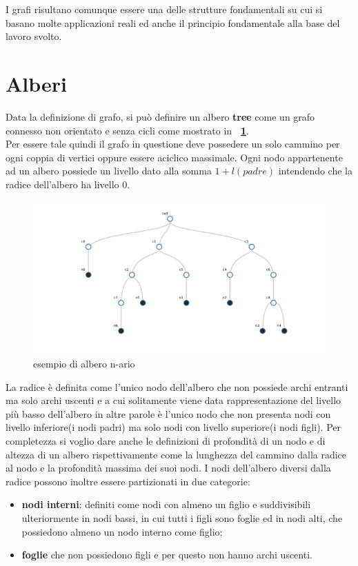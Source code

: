 {I grafi risultano comunque essere una delle strutture fondamentali su cui si basano molte applicazioni reali ed anche il principio fondamentale alla base del lavoro svolto.

\section{Alberi} 
Data la definizione di grafo, si può definire un albero \textbf{tree} come un grafo connesso non orientato e senza cicli come mostrato in \textbf{\figurename~\ref{fig:alberoGenerico}}.\\
Per essere tale quindi il grafo in questione deve possedere un solo cammino per ogni coppia di vertici oppure essere aciclico massimale.
Ogni nodo appartenente ad un albero possiede un livello dato alla somma $ 1 + l(padre) $ intendendo che la radice dell'albero ha livello 0.
\begin{figure}[!htb]
	\begin{center}
		\includegraphics[width=0.8 \linewidth]{figure/alberoGenerico}
	\end{center}
	\caption{esempio di albero n-ario \label{fig:alberoGenerico}}
\end{figure}
La radice è definita come l'unico nodo dell'albero che non possiede archi entranti ma solo archi uscenti e a cui solitamente viene data rappresentazione del livello più basso dell'albero in altre parole è l'unico nodo che non presenta nodi con livello inferiore(i nodi padri) ma solo nodi con livello superiore(i nodi figli). 
Per completezza si voglio dare anche le definizioni di profondità di un nodo e di altezza di un albero rispettivamente come la lunghezza del cammino dalla radice al nodo e la profondità massima dei suoi nodi.
I nodi dell'albero diversi dalla radice possono inoltre essere partizionati in due categorie:
\begin{itemize}
	\item\textbf{nodi interni}: definiti come nodi con almeno un figlio e suddivisibili ulteriormente in nodi bassi, in cui tutti i figli sono foglie ed in nodi alti, che possiedono almeno un nodo interno come figlio;
	\item\textbf{foglie }che non possiedono figli e per questo non hanno archi uscenti.
\end{itemize}

}
